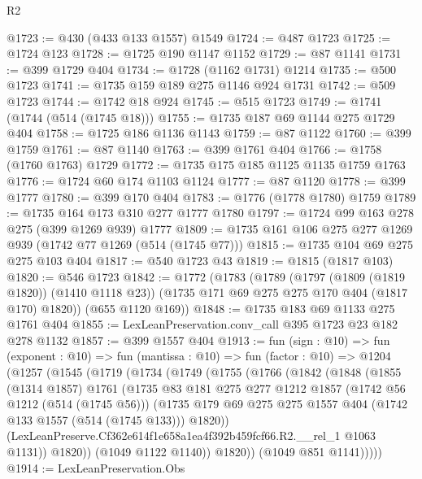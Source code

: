 \begin{lexlean}{R2}
\begin{coremodule}
@1723 := @430 (@433 @133 @1557) @1549
@1724 := @487 @1723
@1725 := @1724 @123
@1728 := @1725 @190 @1147 @1152
@1729 := @87 @1141
@1731 := @399 @1729 @404
@1734 := @1728 (@1162 @1731) @1214
@1735 := @500 @1723
@1741 := @1735 @159 @189 @275 @1146 @924 @1731
@1742 := @509 @1723
@1744 := @1742 @18 @924
@1745 := @515 @1723
@1749 := @1741 (@1744 (@514 (@1745 @18)))
@1755 := @1735 @187 @69 @1144 @275 @1729 @404
@1758 := @1725 @186 @1136 @1143
@1759 := @87 @1122
@1760 := @399 @1759
@1761 := @87 @1140
@1763 := @399 @1761 @404
@1766 := @1758 (@1760 @1763) @1729
@1772 := @1735 @175 @185 @1125 @1135 @1759 @1763
@1776 := @1724 @60 @174 @1103 @1124
@1777 := @87 @1120
@1778 := @399 @1777
@1780 := @399 @170 @404
@1783 := @1776 (@1778 @1780) @1759
@1789 := @1735 @164 @173 @310 @277 @1777 @1780
@1797 := @1724 @99 @163 @278 @275 (@399 @1269 @939) @1777
@1809 := @1735 @161 @106 @275 @277 @1269 @939 (@1742 @77 @1269 (@514 (@1745 @77)))
@1815 := @1735 @104 @69 @275 @275 @103 @404
@1817 := @540 @1723 @43
@1819 := @1815 (@1817 @103)
@1820 := @546 @1723
@1842 := @1772
    (@1783
      (@1789
        (@1797 (@1809 (@1819 @1820)) (@1410 @1118 @23))
        (@1735 @171 @69 @275 @275 @170 @404 (@1817 @170) @1820))
      (@655 @1120 @169))
@1848 := @1735 @183 @69 @1133 @275 @1761 @404
@1855 := LexLeanPreservation.conv_call @395 @1723 @23 @182 @278 @1132
@1857 := @399 @1557 @404
@1913 := fun (sign : @10) =>
  fun (exponent : @10) =>
  fun (mantissa : @10) =>
  fun (factor : @10) =>
  @1204
    (@1257
      (@1545
        (@1719
          (@1734
            (@1749
              (@1755
                (@1766
                  (@1842
                    (@1848
                      (@1855
                        (@1314 @1857)
                        @1761
                        (@1735
                          @83
                          @181
                          @275
                          @277
                          @1212
                          @1857
                          (@1742 @56 @1212 (@514 (@1745 @56)))
                          (@1735
                            @179
                            @69
                            @275
                            @275
                            @1557
                            @404
                            (@1742 @133 @1557 (@514 (@1745 @133)))
                            @1820))
                        (LexLeanPreserve.Cf362e614f1e658a1ea4f392b459fcf66.R2.__rel_1 @1063 @1131))
                      @1820))
                  (@1049 @1122 @1140))
                @1820))
            (@1049 @851 @1141)))))
@1914 := LexLeanPreservation.Obs

\end{coremodule}
\end{lexlean}
